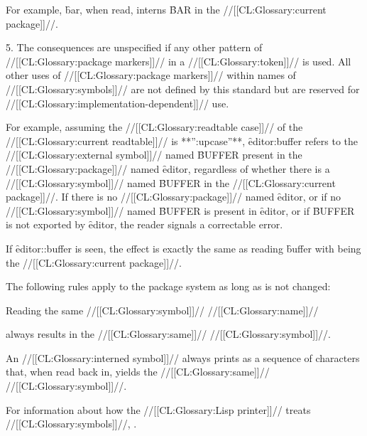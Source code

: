 {For example,  \f{bar}, when read, interns \f{BAR} in the //[[CL:Glossary:current package]]//.

\item{5.} The consequences are unspecified if any other pattern of //[[CL:Glossary:package markers]]// in a //[[CL:Glossary:token]]// is used. All other uses of //[[CL:Glossary:package markers]]// within names of //[[CL:Glossary:symbols]]//  are not defined by this standard  but are reserved for //[[CL:Glossary:implementation-dependent]]// use. \endlist

For example, assuming the //[[CL:Glossary:readtable case]]// of the //[[CL:Glossary:current readtable]]// is **'':upcase''**, \f{editor:buffer} refers to the //[[CL:Glossary:external symbol]]//  named \f{BUFFER} present in the //[[CL:Glossary:package]]// named \f{editor}, regardless of whether there is a //[[CL:Glossary:symbol]]// named \f{BUFFER} in the //[[CL:Glossary:current package]]//.  If there is no //[[CL:Glossary:package]]// named \f{editor}, or if no //[[CL:Glossary:symbol]]// named \f{BUFFER} is present in \f{editor}, or if \f{BUFFER} is not exported by \f{editor}, the reader signals a correctable error.

If \f{editor::buffer} is seen, the effect is exactly the same as reading \f{buffer} with  being the //[[CL:Glossary:current package]]//.

\endsubSection%

 

The following rules apply to the package system as long as   is not changed:

\beginlist {}

Reading the same //[[CL:Glossary:symbol]]// //[[CL:Glossary:name]]//

always results in the //[[CL:Glossary:same]]// //[[CL:Glossary:symbol]]//.


An //[[CL:Glossary:interned symbol]]// always prints as a sequence of characters that,  when read back in, yields the //[[CL:Glossary:same]]// //[[CL:Glossary:symbol]]//.

For information about how the //[[CL:Glossary:Lisp printer]]// treats //[[CL:Glossary:symbols]]//, \seesection\PrintingSymbols.


}
